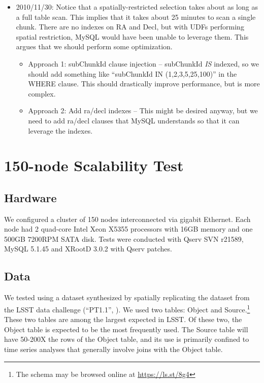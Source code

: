 \documentclass[DM,toc]{lsstdoc}
\begin{document}
\begin{itemize}
\item
  2010/11/30: Notice that a spatially-restricted selection takes about
  as long as a full table scan. This implies that it takes about 25
  minutes to scan a single chunk. There are no indexes on RA and Decl,
  but with UDFs performing spatial restriction, MySQL would have been
  unable to leverage them. This argues that we should perform some
  optimization.

  \begin{itemize}
  \item
    Approach 1: subChunkId clause injection -- subChunkId \emph{IS} indexed,
    so we should add something like ``subChunkId IN (1,2,3,5,25,100)''
    in the WHERE clause. This should drastically improve performance,
    but is more complex.
  \item
    Approach 2: Add ra/decl indexes -- This might be desired anyway,
    but we need to add ra/decl clauses that MySQL understands so that it
    can leverage the indexes.
  \end{itemize}
\end{itemize}


\section{150-node Scalability Test}\label{node-scalability-test}

\subsection{Hardware}\label{hardware-150}

We configured a cluster of 150 nodes interconnected via gigabit
Ethernet. Each node had 2 quad-core Intel Xeon X5355 processors with
16GB memory and one 500GB 7200RPM SATA disk. Tests were conducted with
Qserv SVN r21589, MySQL 5.1.45 and XRootD
3.0.2 with Qserv patches.

\subsection{Data}\label{data}

We tested using a dataset synthesized by spatially replicating the
dataset from the LSST data challenge (``PT1.1'', \citet{Document-26217}). We used two tables:
Object and Source.\footnote{The schema may be browsed online at
  \url{https://ls.st/8g4}} These
two tables are among the largest expected in LSST. Of these two, the
Object table is expected to be the most frequently used. The Source
table will have 50-200X the rows of the Object table, and its use is
primarily confined to time series analyses that generally involve joins
with the Object table.
\end{document}
